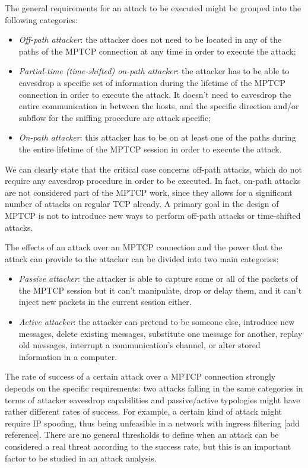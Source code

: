 The general requirements for an attack to be executed might be grouped into the following categories:

\begin{itemize}  
\item \textit{Off-path attacker}: the attacker does not need to be located in any of the paths of the MPTCP connection at any time in order to execute the attack;
\item \textit{Partial-time (time-shifted) on-path attacker}: the attacker has to be able to eavesdrop a specific set of information during the lifetime of the MPTCP connection in order to execute the attack. It doesn't need to eavesdrop the entire communication in between the hosts, and the specific direction and/or subflow for the sniffing procedure are attack specific;
\item \textit{On-path attacker}: this attacker has to be on at least one of the paths during the entire lifetime of the MPTCP session in order to execute the attack.
\end{itemize}

We can clearly state that the critical case concerns off-path attacks, which do not require any eavesdrop procedure in order to be executed. In fact, on-path attacks are not considered part of the MPTCP work, since they allows for a significant number of attacks on regular TCP already. A primary goal in the design of MPTCP is not to introduce new ways to perform off-path attacks or time-shifted attacks.

The effects of an attack over an MPTCP connection and the power that the attack can provide to the attacker can be divided into two main categories:

\begin{itemize}  
\item \textit{Passive attacker}: the attacker is able to capture some or all of the packets of the MPTCP session but it can't manipulate, drop or delay them, and it can't inject new packets in the current session either.
\item \textit{Active attacker}: the attacker can pretend to be someone else, introduce new messages, delete existing messages, substitute one message for another, replay old messages, interrupt a communication's channel, or alter stored information in a computer.
\end{itemize}

The rate of success of a certain attack over a MPTCP connection strongly depends on the specific requirements: two attacks falling in the same categories in terms of attacker eavesdrop capabilities and passive/active typologies might have rather different rates of success. For example, a certain kind of attack might require IP spoofing, thus being unfeasible in a network with ingress filtering [add reference].
There are no general thresholds to define when an attack can be considered a real threat according to the success rate, but this is an important factor to be studied in an attack analysis.

